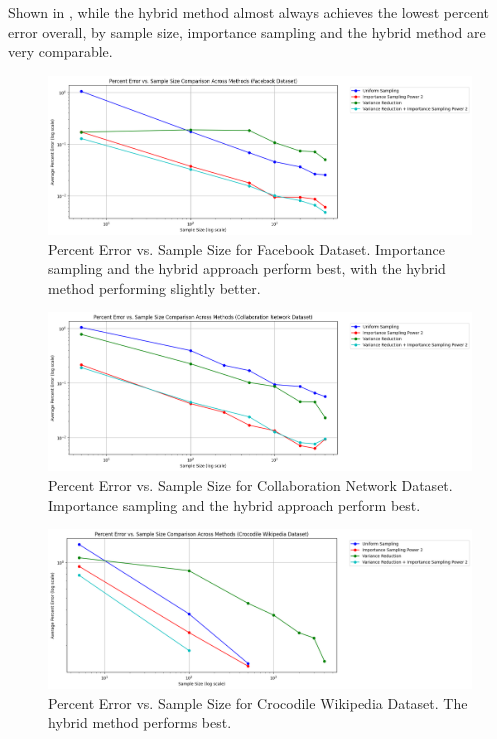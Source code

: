\documentclass[11pt, margin=1in]{article}
\begin{document}
Shown in , while the hybrid method almost always achieves the lowest percent error overall, by sample size, importance sampling and the hybrid method are very comparable.

\begin{figure}[H]
\centering
\includegraphics[width=0.9\linewidth]{plots/comparisons/fb/limited_method_percent_error_vs_sample_size_comparison.png}
\caption{Percent Error vs. Sample Size for Facebook Dataset. Importance sampling and the hybrid approach perform best, with the hybrid method performing slightly better.}
\label{fig:fb_sample_size}
\end{figure}

\begin{figure}[H]
\centering
\includegraphics[width=0.9\linewidth]{plots/comparisons/GrQc/limited_method_percent_error_vs_sample_size_comparison.png}
\caption{Percent Error vs. Sample Size for Collaboration Network Dataset. Importance sampling and the hybrid approach perform best.}
\label{fig:grqc_sample_size}
\end{figure}

\begin{figure}[H]
\centering
\includegraphics[width=0.9\linewidth]{plots/comparisons/croc/limited_method_percent_error_vs_sample_size_comparison.png}
\caption{Percent Error vs. Sample Size for Crocodile Wikipedia Dataset. The hybrid method performs best.}
\label{fig:croc_sample_size}
\end{figure}
\end{document}
